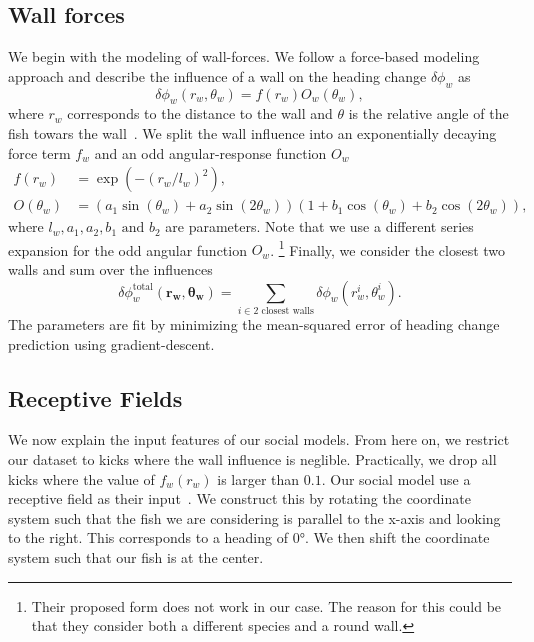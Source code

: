 \documentclass[nobib]{tufte-handout}
\begin{document}
\subsection{Wall forces}
We begin with the modeling of wall-forces.
We follow a force-based modeling approach and describe the influence of a wall on the heading change \(\delta \phi_w\) as
\begin{equation*}
  \delta \phi_w (r_w, \theta_w) = f(r_w)O_w(\theta_w),
\end{equation*}
where $r_w$ corresponds to the distance to the wall and $\theta$ is the relative angle of the fish towars the wall~\autocite{calovi}.
We split the wall influence into an exponentially decaying force term \(f_w\) and an odd angular-response function \(O_w\)
\begin{align*}
  f(r_w) &= \exp \left( -{(r_w/l_w)}^2 \right), \\
  O(\theta_w) &= \left(a_1 \sin(\theta_w) + a_2 \sin(2  \theta_w)  \right)  \left(1 +  b_1  \cos(\theta_w) + b_2 \cos(2  \theta_w) \right),
\end{align*}
where $l_w, a_1, a_2, b_1 \text{ and } b_2$ are parameters.
Note that we use a different series expansion for the odd angular function \(O_w\).%
\footnote{Their proposed form does not work in our case.
  The reason for this could be that they consider both a different species and a round wall.}
Finally, we consider the closest two walls and sum over the influences
\begin{equation*}
 \delta \phi_w^{\text{total}} \left( \bm{r_w}, \bm{\theta_w} \right) = \sum_{i \in 2 \text{ closest walls}} \delta \phi_w (r_w^i, \theta_w^i).
\end{equation*}
The parameters are fit by minimizing the mean-squared error of heading change prediction using gradient-descent.

\subsection{Receptive Fields}
We now explain the input features of our social models.
From here on, we restrict our dataset to kicks where the wall influence is neglible.
Practically, we drop all kicks where the value of \(f_w(r_w)\) is larger than $0.1$.
Our social model use a receptive field as their input~\autocite{discreteModes}.
We construct this by rotating the coordinate system such that the fish we are considering is parallel to the x-axis and looking to the right.
This corresponds to a heading of \ang{0}.
We then shift the coordinate system such that our fish is at the center.
\end{document}

